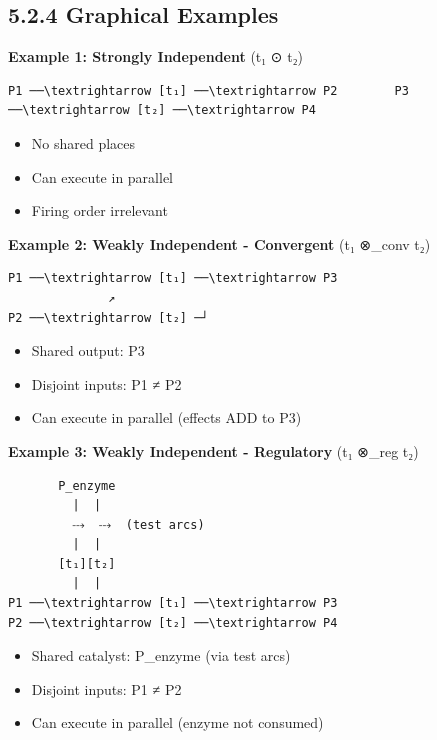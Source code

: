\hypertarget{graphical-examples}{%
\subsection{5.2.4 Graphical Examples}\label{graphical-examples}}

\textbf{Example 1: Strongly Independent} (t₁ ⊙ t₂)

\begin{lstlisting}
P1 ──\textrightarrow [t₁] ──\textrightarrow P2        P3 ──\textrightarrow [t₂] ──\textrightarrow P4
\end{lstlisting}

\begin{itemize}
\tightlist
\item
  No shared places
\item
  Can execute in parallel
\item
  Firing order irrelevant
\end{itemize}

\textbf{Example 2: Weakly Independent - Convergent} (t₁ ⊗\_conv t₂)

\begin{lstlisting}
P1 ──\textrightarrow [t₁] ──\textrightarrow P3
              ↗
P2 ──\textrightarrow [t₂] ─┘
\end{lstlisting}

\begin{itemize}
\tightlist
\item
  Shared output: P3
\item
  Disjoint inputs: P1 ≠ P2
\item
  Can execute in parallel (effects ADD to P3)
\end{itemize}

\textbf{Example 3: Weakly Independent - Regulatory} (t₁ ⊗\_reg t₂)

\begin{lstlisting}
       P_enzyme
         |  |
         ⤏  ⤏  (test arcs)
         |  |
       [t₁][t₂]
         |  |
P1 ──\textrightarrow [t₁] ──\textrightarrow P3
P2 ──\textrightarrow [t₂] ──\textrightarrow P4
\end{lstlisting}

\begin{itemize}
\tightlist
\item
  Shared catalyst: P\_enzyme (via test arcs)
\item
  Disjoint inputs: P1 ≠ P2
\item
  Can execute in parallel (enzyme not consumed)
\end{itemize}

